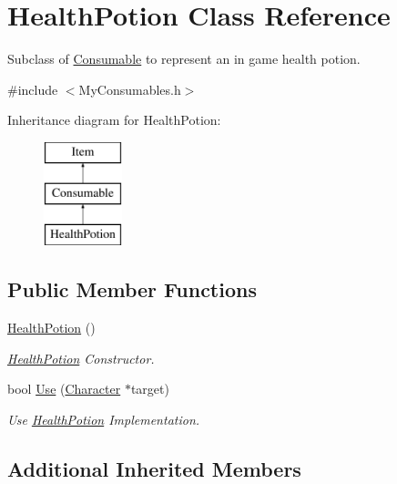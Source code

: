 \hypertarget{classHealthPotion}{\section{Health\-Potion Class Reference}
\label{classHealthPotion}
}


Subclass of \hyperlink{classConsumable}{Consumable} to represent an in game health potion.  




{\ttfamily \#include $<$My\-Consumables.\-h$>$}

Inheritance diagram for Health\-Potion\-:\begin{figure}[H]
\begin{center}
\leavevmode
\includegraphics[height=3.000000cm]{classHealthPotion}
\end{center}
\end{figure}
\subsection*{Public Member Functions}
\begin{DoxyCompactItemize}
\item 
\hyperlink{classHealthPotion_a99e942956f7f1e07dd13c46daae08713}{Health\-Potion} ()
\begin{DoxyCompactList}\small\item\em \hyperlink{classHealthPotion}{Health\-Potion} Constructor. \end{DoxyCompactList}\item 
bool \hyperlink{classHealthPotion_a6fee598a4d80425364c72da18b883615}{Use} (\hyperlink{classCharacter}{Character} $\ast$target)
\begin{DoxyCompactList}\small\item\em Use \hyperlink{classHealthPotion}{Health\-Potion} Implementation. \end{DoxyCompactList}\end{DoxyCompactItemize}
\subsection*{Additional Inherited Members}



